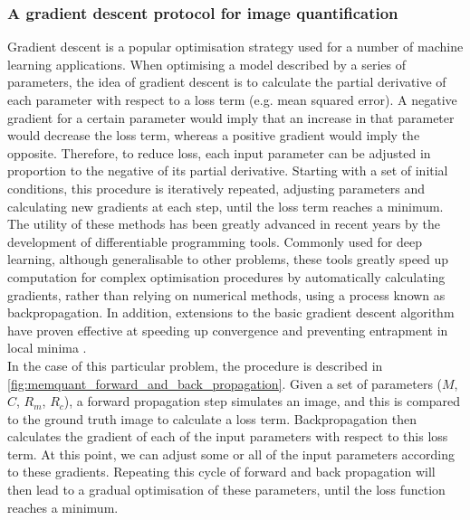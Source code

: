 \documentclass[12pt]{"article"}
\begin{document}
\subsubsection{A gradient descent protocol for image quantification}

Gradient descent is a popular optimisation strategy used for a number of machine learning applications. When optimising a model described by a series of parameters, the idea of gradient descent is to calculate the partial derivative of each parameter with respect to a loss term (e.g. mean squared error). A negative gradient for a certain parameter would imply that an increase in that parameter would decrease the loss term, whereas a positive gradient would imply the opposite. Therefore, to reduce loss, each input parameter can be adjusted in proportion to the negative of its partial derivative. Starting with a set of initial conditions, this procedure is iteratively repeated, adjusting parameters and calculating new gradients at each step, until the loss term reaches a minimum. \\

The utility of these methods has been greatly advanced in recent years by the development of differentiable programming tools. Commonly used for deep learning, although generalisable to other problems, these tools greatly speed up computation for complex optimisation procedures by automatically calculating gradients, rather than relying on numerical methods, using a process known as backpropagation. In addition, extensions to the basic gradient descent algorithm have proven effective at speeding up convergence and preventing entrapment in local minima \citep{Sun2019}. \\

In the case of this particular problem, the procedure is described in \cref{fig:memquant_forward_and_back_propagation}. Given a set of parameters ($M$, $C$, $R_m$, $R_c$), a forward propagation step simulates an image, and this is compared to the ground truth image to calculate a loss term. Backpropagation then calculates the gradient of each of the input parameters with respect to this loss term. At this point, we can adjust some or all of the input parameters according to these gradients. Repeating this cycle of forward and back propagation will then lead to a gradual optimisation of these parameters, until the loss function reaches a minimum. \\
\end{document}

